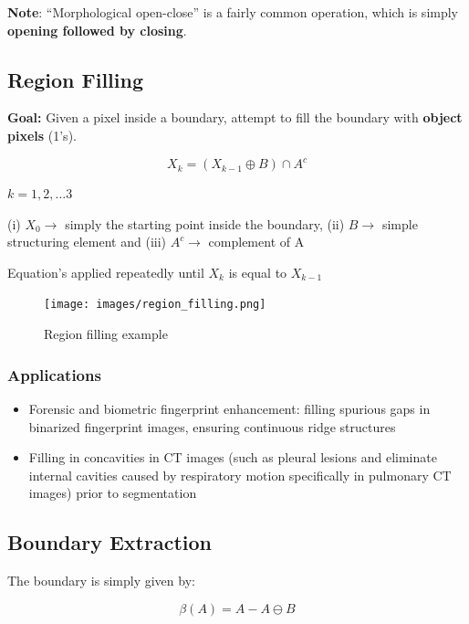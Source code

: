 \textbf{Note}: \enquote{Morphological open-close} is a fairly common
operation, which is simply \textbf{opening followed by closing}.

\subsection*{Region Filling}

\textbf{Goal:} Given a pixel inside a boundary, attempt to fill the
boundary with \textbf{object pixels} (1's).

\begin{equation*}
  X_k = (X_{k-1} \oplus B) \cap A^c
\end{equation*}

$k = 1, 2, \ldots 3$

(i) $X_0 \rightarrow$ simply the starting point inside the boundary,
(ii) $B \rightarrow$ simple structuring element and (iii) $A^c
\rightarrow$ complement of A

Equation's applied repeatedly until $X_k$ is equal to $X_{k-1}$

\begin{figure}[H]
  \centering
  \texttt{[image: images/region\_filling.png]}
  \caption{Region filling example}
\end{figure}

\subsubsection*{Applications}
\begin{itemize}
  \item Forensic and biometric fingerprint enhancement: filling
    spurious gaps in binarized fingerprint images, ensuring
    continuous ridge structures
  \item Filling in concavities in CT images (such as pleural lesions
      and eliminate internal cavities caused by respiratory motion
    specifically in pulmonary CT images) prior to segmentation
\end{itemize}

\subsection*{Boundary Extraction}

The boundary is simply given by:

\begin{equation*}
  \beta(A) = A - A \ominus B
\end{equation*}

